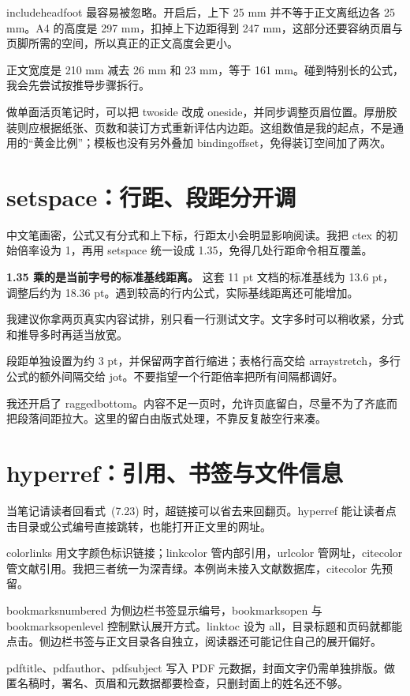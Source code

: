 includeheadfoot 最容易被忽略。开启后，上下 25 mm 并不等于正文离纸边各 25 mm。A4 的高度是 297 mm，扣掉上下边距得到 247 mm，这部分还要容纳页眉与页脚所需的空间，所以真正的正文高度会更小。

正文宽度是 210 mm 减去 26 mm 和 23 mm，等于 161 mm。碰到特别长的公式，我会先尝试按推导步骤拆行。

做单面活页笔记时，可以把 twoside 改成 oneside，并同步调整页眉位置。厚册胶装则应根据纸张、页数和装订方式重新评估内边距。这组数值是我的起点，不是通用的“黄金比例”；模板也没有另外叠加 bindingoffset，免得装订空间加了两次。

\section{setspace：行距、段距分开调}

中文笔画密，公式又有分式和上下标，行距太小会明显影响阅读。我把 ctex 的初始倍率设为 1，再用 setspace 统一设成 1.35，免得几处行距命令相互覆盖。

\textbf{1.35 乘的是当前字号的标准基线距离。} 这套 11 pt 文档的标准基线为 13.6 pt，调整后约为 18.36 pt。遇到较高的行内公式，实际基线距离还可能增加。

我建议你拿两页真实内容试排，别只看一行测试文字。文字多时可以稍收紧，分式和推导多时再适当放宽。

段距单独设置为约 3 pt，并保留两字首行缩进；表格行高交给 arraystretch，多行公式的额外间隔交给 jot。不要指望一个行距倍率把所有间隔都调好。

我还开启了 raggedbottom。内容不足一页时，允许页底留白，尽量不为了齐底而把段落间距拉大。这里的留白由版式处理，不靠反复敲空行来凑。

\section{hyperref：引用、书签与文件信息}

当笔记请读者回看式~(7.23) 时，超链接可以省去来回翻页。hyperref 能让读者点击目录或公式编号直接跳转，也能打开正文里的网址。

colorlinks 用文字颜色标识链接；linkcolor 管内部引用，urlcolor 管网址，citecolor 管文献引用。我把三者统一为深青绿。本例尚未接入文献数据库，citecolor 先预留。

bookmarksnumbered 为侧边栏书签显示编号，bookmarksopen 与 bookmarksopenlevel 控制默认展开方式。linktoc 设为 all，目录标题和页码就都能点击。侧边栏书签与正文目录各自独立，阅读器还可能记住自己的展开偏好。

pdftitle、pdfauthor、pdfsubject 写入 PDF 元数据，封面文字仍需单独排版。做匿名稿时，署名、页眉和元数据都要检查，只删封面上的姓名还不够。

